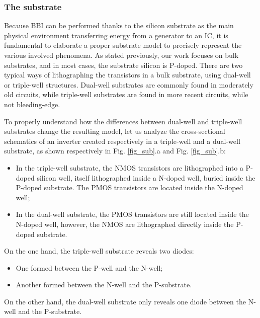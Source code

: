 	\subsubsection{The substrate}
	
	Because BBI can be performed thanks to the silicon substrate as the main physical environment transferring energy from a generator to an IC, it is fundamental to elaborate a proper substrate model to precisely represent the various involved phenomena.
	As stated previously, our work focuses on bulk substrates, and in most cases, the substrate silicon is P-doped.
	There are two typical ways of lithographing the transistors in a bulk substrate, using dual-well or triple-well structures.
	Dual-well substrates are commonly found in moderately old circuits, while triple-well substrates are found in more recent circuits, while not bleeding-edge.

	To properly understand how the differences between dual-well and triple-well substrates change the resulting model, let us analyze the cross-sectional schematics of an inverter created respectively in a triple-well and a dual-well substrate, as shown respectively in Fig. \ref{fig_sub}.a and Fig. \ref{fig_sub}.b:
	\begin{itemize}
		\item In the triple-well substrate, the NMOS transistors are lithographed into a P-doped silicon well, itself lithographed inside a N-doped well, buried inside the P-doped substrate. The PMOS transistors are located inside the N-doped well;
		\item In the dual-well substrate, the PMOS transistors are still located inside the N-doped well, however, the NMOS are lithographed directly inside the P-doped substrate.
	\end{itemize}
	On the one hand, the triple-well substrate reveals two diodes:
	\begin{itemize}
		\item One formed between the P-well and the N-well;
		\item Another formed between the N-well and the P-substrate.
	\end{itemize}
	On the other hand, the dual-well substrate only reveals one diode between the N-well and the P-substrate.

